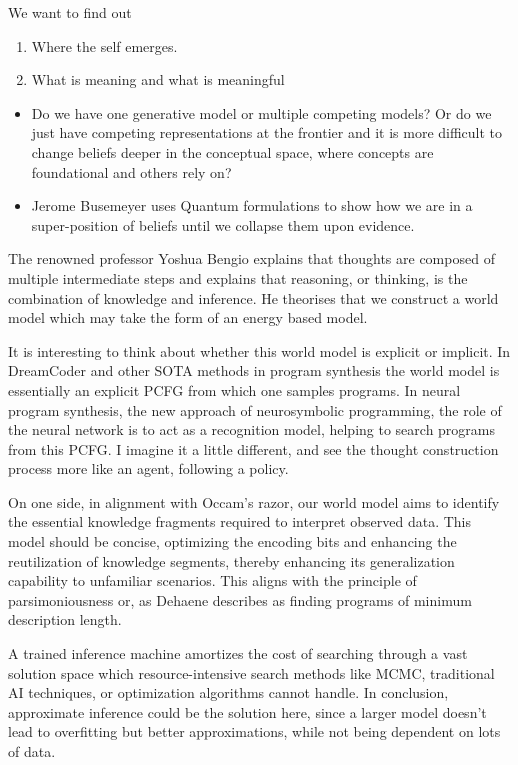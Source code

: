 We want to find out

\begin{enumerate}
    \item Where the self emerges.
    \item What is meaning and what is meaningful
\end{enumerate}


\begin{itemize}
    \item Do we have one generative model or multiple competing models? Or do we just have competing representations at the frontier and it is more difficult to change beliefs deeper in the conceptual space, where concepts are foundational and others rely on?
    \item Jerome Busemeyer uses Quantum formulations to show how we are in a super-position of beliefs until we collapse them upon evidence. 
\end{itemize}

The renowned professor Yoshua Bengio explains that thoughts are composed of multiple intermediate steps and explains that reasoning, or thinking, is the combination of knowledge and inference. 
He theorises that we construct a world model which may take the form of an energy based model.

It is interesting to think about whether this world model is explicit or implicit. In DreamCoder and other SOTA methods in program synthesis the world model is essentially an explicit PCFG from which one samples programs. In neural program synthesis, the new approach of neurosymbolic programming, the role of the neural network is to act as a recognition model, helping to search programs from this PCFG.
I imagine it a little different, and see the thought construction process more like an agent, following a policy.

On one side, in alignment with Occam's razor, our world model aims to identify the essential knowledge fragments required to interpret observed data. This model should be concise, optimizing the encoding bits and enhancing the reutilization of knowledge segments, thereby enhancing its generalization capability to unfamiliar scenarios. This aligns with the principle of parsimoniousness or, as Dehaene describes as finding programs of minimum description length.

A trained inference machine amortizes the cost of searching through a vast solution space which resource-intensive search methods like MCMC, traditional AI techniques, or optimization algorithms cannot handle.
In conclusion, approximate inference could be the solution here, since a larger model doesn't lead to overfitting but better approximations, while not being dependent on lots of data.

